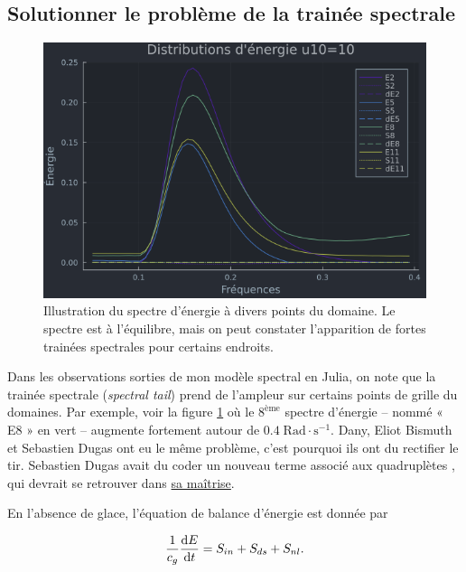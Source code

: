 \documentclass[10pt]{article}
\numberwithin{equation}{section}
\newcommand{\rad}{\text{Rad}}
\begin{document}
\newpage
\subsection{Solutionner le problème de la trainée spectrale}
\label{sec:org296c2ad}

\begin{figure}
\begin{center}
\vspace{-0.8cm}
\includegraphics[width=0.8\linewidth]{Figures/figures/Spectral-tail.png}
\end{center}
\caption{\label{org580281b}Illustration du spectre d'énergie à divers points du domaine. Le spectre est à l'équilibre, mais on peut constater l'apparition de fortes trainées spectrales pour certains endroits.}
\end{figure}

Dans les observations sorties de mon modèle spectral en Julia, on note que la trainée spectrale (\emph{spectral tail}) prend de l'ampleur sur certains points de grille du domaines.
Par exemple, voir la figure \ref{org580281b} où le \(8^{\text{ème}}\) spectre d'énergie -- nommé « E8 » en vert -- augmente fortement autour de \(0.4\;\rad\cdot\mathrm{s}^{-1}\).
Dany, Eliot Bismuth et Sebastien Dugas ont eu le même problème, c'est pourquoi ils ont du rectifier le tir. Sebastien Dugas avait du coder un nouveau terme associé aux quadruplètes \autocite{Hasselmann_1962}, qui devrait se retrouver dans \href{https://semaphore.uqar.ca/id/eprint/1846/}{sa maîtrise}.\bigskip

En l'absence de glace, l'équation de balance d'énergie est donnée par

\begin{equation}
   \frac{1}{c_g} \dv{E}{t} = S_{in} + S_{ds} + S_{nl}.
\end{equation}
\end{document}

